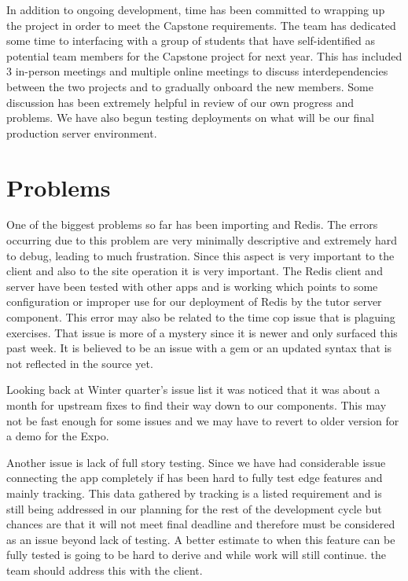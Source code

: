 \documentclass[onecolumn, draftclsnofoot,10pt, compsoc]{IEEEtran}
\begin{document}
In addition to ongoing development, time has been committed to wrapping up the project in order to meet the Capstone requirements. The team has dedicated some time to interfacing with a group of students that have self-identified as potential team members for the Capstone project for next year. This has included 3 in-person meetings and multiple online meetings to discuss interdependencies between the two projects and to gradually onboard the new members. Some discussion has been extremely helpful in review of our own progress and problems. We have also begun testing deployments on what will be our final production server environment. 


\section{Problems}
One of the biggest problems so far has been importing and Redis. The errors occurring due to this problem are very minimally descriptive and extremely hard to debug, leading to much frustration. Since this aspect is very important to the client and also to the site operation it is very important. The Redis client and server have been tested with other apps and is working which points to some configuration or improper use for our deployment of Redis by the tutor server component. This error may also be related to the time cop issue that is plaguing exercises. That issue is more of a mystery since it is newer and only surfaced this past week. It is believed to be an issue with a gem or an updated syntax that is not reflected in the source yet. 

Looking back at Winter quarter's issue list it was noticed that it was about a month for upstream fixes to find their way down to our components. This may not be fast enough for some issues and we may have to revert to older version for a demo for the Expo. 

Another issue is lack of full story testing. Since we have had considerable issue connecting the app completely if has been hard to fully test edge features and mainly tracking. This data gathered by tracking is a listed requirement and is still being addressed in our planning for the rest of the development cycle but chances are that it will not meet final deadline and therefore must be considered as an issue beyond lack of testing. A better estimate to when this feature can be fully tested is going to be hard to derive and while work will still continue. the team should address this with the client. 
\end{document}
